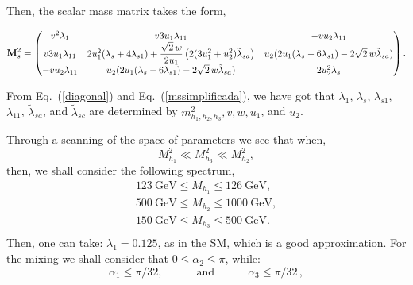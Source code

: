 \documentclass[aps,prd,groupaddress,floatfix,tighten,nofootinbib,showpacs,
amsfonts,superscriptaddress]{revtex4}
\def\be{\begin{equation}}
\def\ee{\end{equation}}
\begin{document}
Then, the scalar mass matrix takes the form,
{
\begin{small}
\begin{eqnarray} \label{mssimplificada}
{\bf M}_s^2 = \begin{pmatrix}
 v^2 \lambda_{1}    &  v 3u_1\lambda_{11}   & -v u_2 \lambda_{11}    \\
 v 3u_1\lambda_{11}  &  2u_1^2(\lambda_s + 4\lambda_{s1}) +\displaystyle\frac{ \sqrt{2}\, w}{2u_1}\left(2(3 u_1^2 +  u_2^2) \tilde\lambda_{sa}  \right) & u_2(2u_1(\lambda_s-6\lambda_{s1})-2\sqrt{2} \, w \tilde\lambda_{sa})  \\
 -v u_2 \lambda_{11} & u_2(2u_1(\lambda_s-6\lambda_{s1})-2\sqrt{2} \, w \tilde\lambda_{sa})  & 2u_2^2\lambda_s
\end{pmatrix}.
\end{eqnarray} 
\end{small}}
%

From Eq.~(\ref{diagonal}) and Eq.~(\ref{mssimplificada}), we have got that 
$\lambda_{1}$, $\lambda_{s}$, $\lambda_{s1}$, $\lambda_{11}$, $\tilde\lambda_{sa}$, and $\tilde\lambda_{sc}$ 
are determined by $m_{h_1,h_2,h_3}^2, v, w, u_1$, and $u_2$.

Through a scanning of the space of parameters we see that when,
%
$$
M^2_{h_1}  \ll M^2_{h_3} \ll M^2_{h_2},
$$
%
then, we shall consider the following spectrum,
%
\be
\begin{array}{c}
123 \ \mathrm{GeV} \leq M_{h_1} \leq 126 \ \mathrm{GeV}, \\
500 \ \mathrm{GeV} \leq M_{h_2} \leq 1000 \ \mathrm{GeV}, \\
150 \ \mathrm{GeV} \leq M_{h_3} \leq 500 \ \mathrm{GeV}. \\
\end{array}
\ee
%
Then, one can take:  $\lambda_1=0.125$, as in the SM, which is a good approximation. For the mixing we shall consider that $0 \leq \alpha_2 \leq \pi$, while:
%
\be
\alpha_1 \leq \pi/32, \quad \qquad \text{and} \qquad \quad \alpha_3 \leq \pi/32 \, ,
\ee 
%
\end{document}
